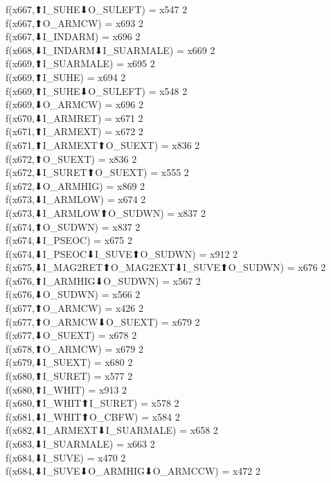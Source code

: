 f(x667,⬆I_SUHE⬇O_SULEFT) = x547 {2} \\
f(x667,⬆O_ARMCW) = x693 {2} \\
f(x667,⬇I_INDARM) = x696 {2} \\
f(x668,⬇I_INDARM⬇I_SUARMALE) = x669 {2} \\
f(x669,⬆I_SUARMALE) = x695 {2} \\
f(x669,⬆I_SUHE) = x694 {2} \\
f(x669,⬆I_SUHE⬇O_SULEFT) = x548 {2} \\
f(x669,⬇O_ARMCW) = x696 {2} \\
f(x670,⬇I_ARMRET) = x671 {2} \\
f(x671,⬆I_ARMEXT) = x672 {2} \\
f(x671,⬆I_ARMEXT⬆O_SUEXT) = x836 {2} \\
f(x672,⬆O_SUEXT) = x836 {2} \\
f(x672,⬇I_SURET⬆O_SUEXT) = x555 {2} \\
f(x672,⬇O_ARMHIG) = x869 {2} \\
f(x673,⬇I_ARMLOW) = x674 {2} \\
f(x673,⬇I_ARMLOW⬆O_SUDWN) = x837 {2} \\
f(x674,⬆O_SUDWN) = x837 {2} \\
f(x674,⬇I_PSEOC) = x675 {2} \\
f(x674,⬇I_PSEOC⬇I_SUVE⬆O_SUDWN) = x912 {2} \\
f(x675,⬇I_MAG2RET⬆O_MAG2EXT⬇I_SUVE⬆O_SUDWN) = x676 {2} \\
f(x676,⬆I_ARMHIG⬇O_SUDWN) = x567 {2} \\
f(x676,⬇O_SUDWN) = x566 {2} \\
f(x677,⬆O_ARMCW) = x426 {2} \\
f(x677,⬆O_ARMCW⬇O_SUEXT) = x679 {2} \\
f(x677,⬇O_SUEXT) = x678 {2} \\
f(x678,⬆O_ARMCW) = x679 {2} \\
f(x679,⬇I_SUEXT) = x680 {2} \\
f(x680,⬆I_SURET) = x577 {2} \\
f(x680,⬆I_WHIT) = x913 {2} \\
f(x680,⬆I_WHIT⬆I_SURET) = x578 {2} \\
f(x681,⬇I_WHIT⬆O_CBFW) = x584 {2} \\
f(x682,⬇I_ARMEXT⬇I_SUARMALE) = x658 {2} \\
f(x683,⬇I_SUARMALE) = x663 {2} \\
f(x684,⬇I_SUVE) = x470 {2} \\
f(x684,⬇I_SUVE⬇O_ARMHIG⬇O_ARMCCW) = x472 {2} \\
